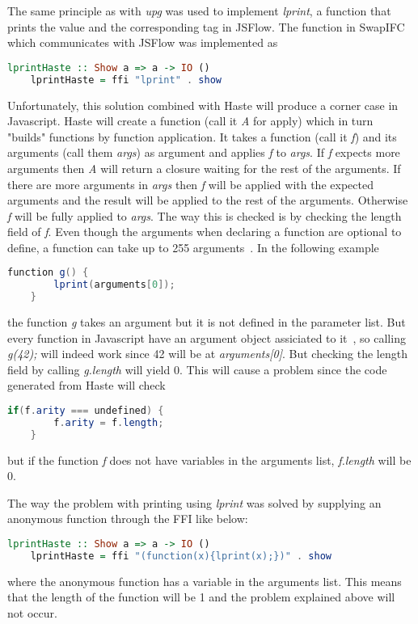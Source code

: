 The same principle as with \emph{upg} was used to implement \emph{lprint}, a function that prints the value and the corresponding tag in JSFlow. The function in SwapIFC which communicates with JSFlow was implemented as
\begin{center}
  \begin{lstlisting}[language=Haskell]
    lprintHaste :: Show a => a -> IO ()
    lprintHaste = ffi "lprint" . show
  \end{lstlisting}
\end{center}
Unfortunately, this solution combined with Haste will produce a corner case in Javascript. Haste will create a function (call it \emph{A} for apply) which in turn "builds" functions by function application. It takes a function (call it \emph{f}) and its arguments (call them \emph{args}) as argument and applies \emph{f} to \emph{args}. If \emph{f} expects more arguments then \emph{A} will return a closure waiting for the rest of the arguments. If there are more arguments in \emph{args} then \emph{f} will be applied with the expected arguments and the result will be applied to the rest of the arguments. Otherwise \emph{f} will be fully applied to \emph{args}. The way this is checked is by checking the length field of \emph{f}. Even though the arguments when declaring a function are optional to define, a function can take up to 255 arguments~\cite{js-function}. In the following example
\begin{center}
  \begin{lstlisting}[language=Java]
    function g() {
        lprint(arguments[0]);
    }
  \end{lstlisting}
\end{center}
the function \emph{g} takes an argument but it is not defined in the parameter list. But every function in Javascript have an argument object assiciated to it~\cite{js-arguments}, so calling \emph{g(42);} will indeed work since 42 will be at \emph{arguments[0]}. But checking the length field by calling \emph{g.length} will yield 0. This will cause a problem since the code generated from Haste will check
\begin{center}
  \begin{lstlisting}[language=Java]
    if(f.arity === undefined) {
        f.arity = f.length;
    }
  \end{lstlisting}
\end{center}
but if the function \emph{f} does not have variables in the arguments list, \emph{f.length} will be 0.

The way the problem with printing using \emph{lprint} was solved by supplying an anonymous function through the FFI like below:
\begin{center}
  \begin{lstlisting}[language=Haskell]
    lprintHaste :: Show a => a -> IO ()
    lprintHaste = ffi "(function(x){lprint(x);})" . show
  \end{lstlisting}
\end{center}
where the anonymous function has a variable in the arguments list. This means that the length of the function will be 1 and the problem explained above will not occur. 

